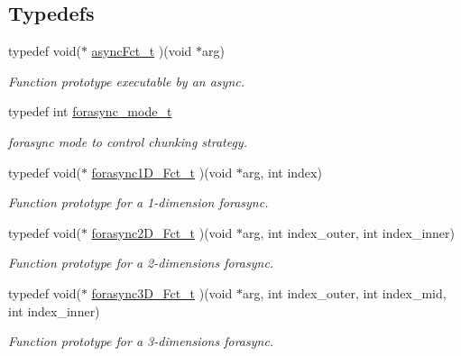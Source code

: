\subsection*{Typedefs}
\begin{DoxyCompactItemize}
\item 
typedef void($\ast$ \hyperlink{group__HClib_ga20743540e3494c2c031dffd26bf92915}{async\-Fct\-\_\-t} )(void $\ast$arg)
\begin{DoxyCompactList}\small\item\em Function prototype executable by an async. \end{DoxyCompactList}\item 
\hypertarget{group__HClib_gac5a6aae98ea2921fc0f474327e3b3b27}{typedef int \hyperlink{group__HClib_gac5a6aae98ea2921fc0f474327e3b3b27}{forasync\-\_\-mode\-\_\-t}}\label{group__HClib_gac5a6aae98ea2921fc0f474327e3b3b27}

\begin{DoxyCompactList}\small\item\em forasync mode to control chunking strategy. \end{DoxyCompactList}\item 
typedef void($\ast$ \hyperlink{group__HClib_gac1d6e6334c34de2b8f463abf8de88e70}{forasync1\-D\-\_\-\-Fct\-\_\-t} )(void $\ast$arg, int index)
\begin{DoxyCompactList}\small\item\em Function prototype for a 1-\/dimension forasync. \end{DoxyCompactList}\item 
typedef void($\ast$ \hyperlink{group__HClib_ga42a1c141adcbaabe1348096598267c7d}{forasync2\-D\-\_\-\-Fct\-\_\-t} )(void $\ast$arg, int index\-\_\-outer, int index\-\_\-inner)
\begin{DoxyCompactList}\small\item\em Function prototype for a 2-\/dimensions forasync. \end{DoxyCompactList}\item 
typedef void($\ast$ \hyperlink{group__HClib_gaafc8178ebe5548c145468f9ceb5cc8bd}{forasync3\-D\-\_\-\-Fct\-\_\-t} )(void $\ast$arg, int index\-\_\-outer, int index\-\_\-mid, int index\-\_\-inner)
\begin{DoxyCompactList}\small\item\em Function prototype for a 3-\/dimensions forasync. \end{DoxyCompactList}\end{DoxyCompactItemize}

